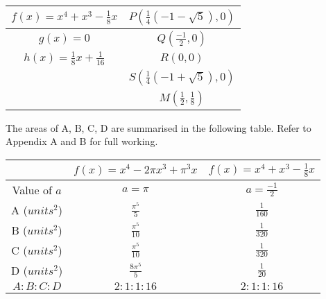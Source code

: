 \documentclass{homework}
\begin{document}
\begin{flushleft}
\begin{paracol}{2}
\begin{tabular}{|c|c|}
  $f(x)=x^4+x^3-\frac{1}{8}x$ & $P(\frac{1}{4}(-1-\sqrt{5}), 0)$ \\ \hline
  $g(x)=0$ & $Q(\frac{-1}{2},0)$ \\ \hline
  $h(x)=\frac{1}{8}x+\frac{1}{16}$ & $R(0, 0)$ \\ \hline
   & $S(\frac{1}{4}(-1+\sqrt{5}),0)$ \\ \hline
   & $M(\frac{1}{2},\frac{1}{8})$ \\ \hline
  \end{tabular} 
\end{paracol}
    \vspace{1.4em} The areas of A, B, C, D are summarised in the following table. Refer to Appendix A and B for full working.
    \end{flushleft}
\begin{center}
\begingroup
\setlength{\tabcolsep}{3.6em}
\renewcommand{\arraystretch}{1.6}
    \begin{tabular}{ |c|c|c| } 
        \hline
        {} & $f(x)=x^4-2\pi x^3+\pi^3x$ & $f(x)=x^4+x^3-\frac{1}{8}x$ \\
        \hline
        Value of $a$ & $a=\pi$ & {$a=\frac{-1}{2}$} \\
        \hline
        A ($units^2$) & $\frac{\pi^5}{5}$ & {$\frac{1}{160}$} \\
        \hline
        B ($units^2$) & $\frac{\pi^5}{10}$ & {$\frac{1}{320}$} \\
        \hline
        C ($units^2$) & $\frac{\pi^5}{10}$ & {$\frac{1}{320}$} \\
        \hline
        D ($units^2$) & $\frac{8\pi^5}{5}$ & {$\frac{1}{20}$} \\
        \hline 
        $A:B:C:D$ & $2:1:1:16$ & $2:1:1:16$ \\
        \hline
    \end{tabular} \vspace{1.3em}
\endgroup
\end{center}
\end{document}
